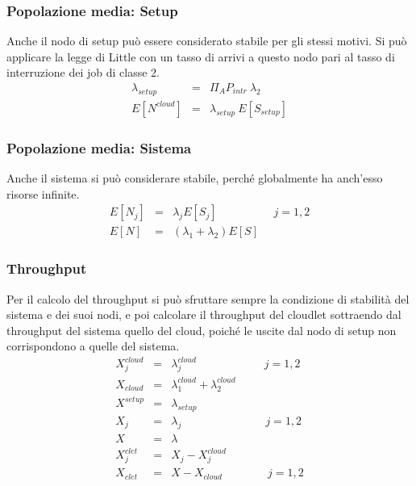 \subsubsection{Popolazione media: Setup}
Anche il nodo di setup può essere considerato stabile per gli stessi motivi.
Si può applicare la legge di Little con un tasso di arrivi a questo nodo pari al
tasso di interruzione dei job di classe 2.
\begin{eqnarray}
\lambda_{setup} &=& \Pi_A P_{intr} \ \lambda_2    \nonumber \\
E[N^{cloud}] &=& \lambda_{setup} \ E[S_{setup}] 
\end{eqnarray}
%
\subsubsection{Popolazione media: Sistema}
Anche il sistema si può considerare stabile, perché globalmente ha anch'esso
risorse infinite.
\begin{eqnarray}
E[N_j] &=& \lambda_j E[S_j]  \qquad\quad\qquad j=1,2 \\
E[N] &=& (\lambda_1 + \lambda_2) E[S]
\end{eqnarray}
%
\subsubsection{Throughput}
Per il calcolo del throughput si può sfruttare sempre la condizione di stabilità
del sistema e dei suoi nodi, e poi calcolare il throughput del cloudlet
sottraendo dal throughput del sistema quello del cloud, poiché le uscite dal
nodo di setup non corrispondono a quelle del sistema.
\begin{eqnarray}
X_j^{cloud} &=& \lambda_j^{cloud}   \qquad\quad\qquad\quad j=1,2 \\
X_{cloud} &=& \lambda_1^{cloud} + \lambda_2^{cloud}   \\
X^{setup} &=& \lambda_{setup}   \\
X_j &=& \lambda_j  \ \quad\qquad\quad\qquad \ \quad j=1,2 \\
X &=& \lambda \\
X_j^{clet} &=& X_j - X_j^{cloud} \\
X_{clet} &=& X - X_{cloud} \quad\qquad\quad j=1,2
\end{eqnarray}
